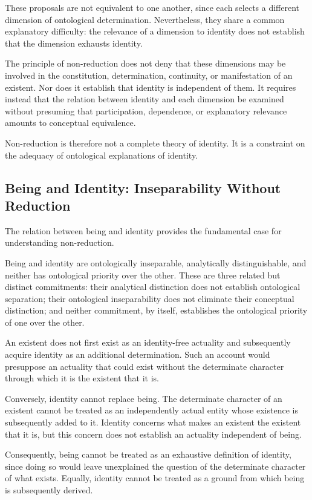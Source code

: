 These proposals are not equivalent to one another, since each
selects a different dimension of ontological determination.
Nevertheless, they share a common explanatory difficulty:
the relevance of a dimension to identity does not establish
that the dimension exhausts identity.

The principle of non-reduction does not deny that these
dimensions may be involved in the constitution, determination,
continuity, or manifestation of an existent. Nor does it
establish that identity is independent of them. It requires
instead that the relation between identity and each dimension
be examined without presuming that participation, dependence,
or explanatory relevance amounts to conceptual equivalence.

Non-reduction is therefore not a complete theory of identity.
It is a constraint on the adequacy of ontological explanations
of identity.

\subsection{Being and Identity: Inseparability Without Reduction}

The relation between being and identity provides the
fundamental case for understanding non-reduction.

Being and identity are ontologically inseparable, analytically
distinguishable, and neither has ontological priority over
the other. These are three related but distinct commitments:
their analytical distinction does not establish ontological
separation; their ontological inseparability does not eliminate
their conceptual distinction; and neither commitment, by
itself, establishes the ontological priority of one over the
other.

An existent does not first exist as an identity-free actuality
and subsequently acquire identity as an additional
determination. Such an account would presuppose an actuality
that could exist without the determinate character through
which it is the existent that it is.

Conversely, identity cannot replace being. The determinate
character of an existent cannot be treated as an independently
actual entity whose existence is subsequently added to it.
Identity concerns what makes an existent the existent that
it is, but this concern does not establish an actuality
independent of being.

Consequently, being cannot be treated as an exhaustive
definition of identity, since doing so would leave unexplained
the question of the determinate character of what exists.
Equally, identity cannot be treated as a ground from which
being is subsequently derived.

